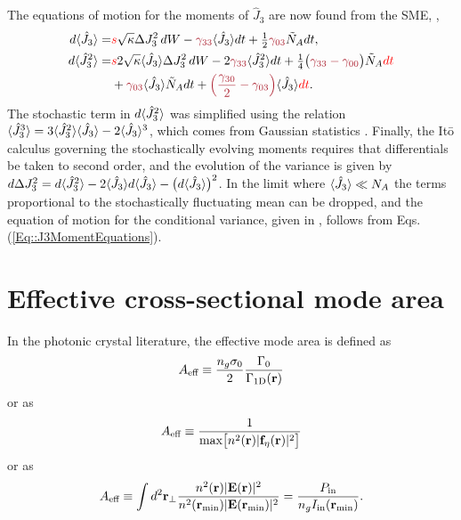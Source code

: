 \documentclass[preprint,aps,pra,onecolumn]{revtex4-1} %
\newcommand{\oneD}{{\rm 1D}}
\newcommand{\inp}{{\rm in}}
\newcommand{\varz}{\Delta J_3^2}
\newcommand{\jz}{\hat{J}_3}
\newcommand{\lrate}{\Gamma_{\rm loss}}
\newcommand{\prate}{\Gamma_{\rm pol}}
\newcommand{\zrateA}{\tilde{\Gamma}}
\newcommand{\zrateB}{\Gamma_{?}}
\newcommand{\change}[1]{{\color{RoyalBlue} #1}}
\newcommand{\comment}[1]{{\color{Maroon} #1}}
\newcommand{\error}[1]{{\color{red} #1}}
\begin{document}
\begin{appendix}
The equations of motion for the moments of $\jz$ are now found from the SME, , 
	\begin{subequations} \label{Eq::J3MomentEquations}
	\begin{align} 
		d \expt{\jz} =& \error{s} \sqrt{\kappa} \varz \, dW - \comment{\gamma_{33}} \expt{\jz}dt + \smallfrac{1}{2} \comment{\gamma_{03}} \tilde{N}_A dt ,  \\
		d \expt{\jz^2} %
		=& \error{s} 2\sqrt{\kappa} \expt{\jz}\Delta J_3^2 \, dW - 2 \comment{\gamma_{33}} \expt{\jz^2}dt + \smallfrac{1}{4} \big( \comment{\gamma_{33}-\gamma_{00}}\big) \tilde{N}_A \error{dt} \\
		&+ \comment{\gamma_{03}} \expt{\jz} \tilde{N}_A dt + \comment{\left(\frac{\gamma_{30}}{2}-\gamma_{03}\right)}\expt{\jz}\error{dt}. \nonumber 
	\end{align}
	\end{subequations}
The stochastic term in $d\expt{\jz^2}$ was simplified using the relation $\expt{\jz^3} = 3\expt{\jz^2}\expt{\jz}- 2\expt{\jz}^3$, which comes from Gaussian statistics \cite{jacobs_straightforward_2006}. 
Finally, the It\={o} calculus governing the stochastically evolving moments requires that differentials be taken to second order, and the evolution of the variance is given by $d \varz = d \expt{\jz^2} - 2 \expt{\jz} d \expt{\jz} - \big( d \expt{\jz} \big)^2$. In the limit where $\expt{\jz}\ll N_A$ the terms proportional to the stochastically fluctuating mean can be dropped, and the equation of motion for the conditional variance, given in , follows from Eqs. (\ref{Eq::J3MomentEquations}).


\change{
\section{Effective cross-sectional mode area} \label{Appendix::ModeArea}
In the photonic crystal literature, the effective mode area is defined as \cite{goban_atomlight_2014}
	\begin{align}
		A_\eff \equiv \frac{n_g \sigma_0}{2} \frac{\Gamma_0}{\Gamma_\oneD(\mathbf{r})}
	\end{align}
or as \cite{manga_rao_single_2007}
	\begin{align}
		A_{\text{eff}} \equiv \frac{1}{ \mbox{max} \big[ n^2(\mathbf{r}) |\mathbf{f}_\eta(\mathbf{r})|^2 \big]}
	\end{align}
or as \cite{hung_trapped_2013}
	\begin{align}
		A_\eff \equiv \int d^2 \mathbf{r}_\perp \frac{n^2(\mathbf{r}) |\mathbf{E}(\mathbf{r})|^2 }{n^2(\mathbf{r}_{\rm min}) |\mathbf{E}(\mathbf{r}_{\rm min})|^2 } =  \frac{P_\inp}{ n_g  I_\inp(\mathbf{r}_{\rm min}) }.
	\end{align}
	
}
\end{appendix}
\end{document}
